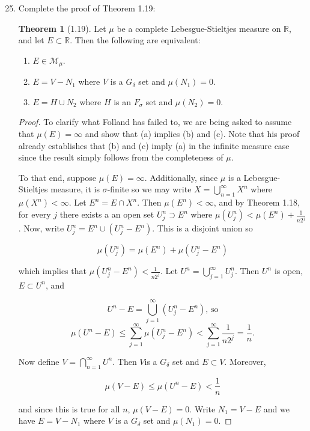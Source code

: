 \documentclass[11pt,oneside,english]{amsart}
\theoremstyle{definition}
\newtheorem*{theorem*}{Theorem}
\newcommand{\R}{\mathbb{R}}
\newcommand{\MC}[1]{\mathcal{#1}}
\begin{document}
\begin{enumerate}
\setcounter{enumi}{24}

\item Complete the proof of Theorem 1.19:

\begin{theorem*}[1.19]
Let $\mu$ be a complete Lebesgue-Stieltjes measure on $\R$, and let $E\subset \R$. Then the following are equivalent:
\begin{enumerate}
\item $E\in\MC{M}_\mu$.
\item $E=V-N_1$ where $V$ is a $G_\delta$ set and $\mu(N_1)=0$.
\item $E=H\cup N_2$ where $H$ is an $F_\sigma$ set and $\mu(N_2)=0$.
\end{enumerate}
\end{theorem*} 

\begin{proof}
To clarify what Folland has failed to, we are being asked to assume that $\mu(E)=\infty$ and show that (a) implies (b) and (c). Note that his proof already establishes that (b) and (c) imply (a) in the infinite measure case since the result simply follows from the completeness of $\mu$.

To that end, suppose $\mu(E)=\infty$. Additionally, since $\mu$ is a Lebesgue-Stieltjes measure, it is $\sigma$-finite so we may write $X=\bigcup_{n=1}^\infty X^n$ where $\mu(X^n)<\infty$. Let $E^n= E\cap X^n$. Then $\mu(E^n)<\infty$, and by Theorem 1.18, for every $j$ there exists a an open set $U_j^n\supset E^n$ where $\mu(U_j^n)<\mu(E^n)+\frac{1}{n2^j}$. Now, write $U_j^n=E^n\cup(U_j^n-E^n)$. This is a disjoint union so

\[
\mu(U_j^n)=\mu(E^n)+\mu(U_j^n-E^n)
\]

which implies that $\mu(U_j^n-E^n)< \frac{1}{n2^j}$. Let $U^n=\bigcup_{j=1}^\infty U_j^n$. Then $U^n$ is open, $E\subset U^n$, and 

\[
U^n-E=\bigcup_{j=1}^\infty (U_j^n-E^n)\text{, so}
\]
\[
\mu(U^n-E)\leq \sum_{j=1}^\infty\mu(U_j^n-E^n)<\sum_{j=1}^\infty\frac{1}{n2^j}=\frac{1}{n}.
\]

Now define $V=\bigcap_{n=1}^\infty U^n$. Then $V$is a $G_\delta$ set and $E\subset V$. Moreover,

\[
\mu(V-E)\leq\mu(U^n-E)<\frac{1}{n}
\]

and since this is true for all $n$, $\mu(V-E)=0$. Write $N_1=V-E$ and we have $E=V-N_1$ where $V$ is a $G_\delta$ set and $\mu(N_1)=0$.


\end{proof}
\end{enumerate}
\end{document}
